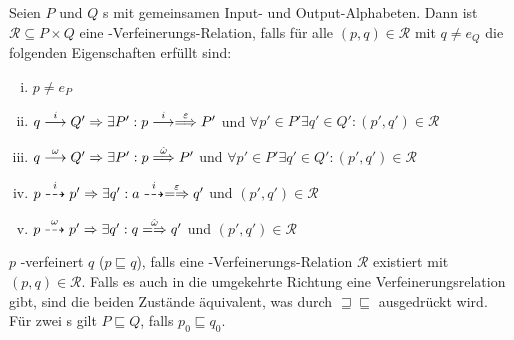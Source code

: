 \begin{Def}
  Seien $P$ und $Q$ \MIA{}s mit gemeinsamen Input- und Output-Alphabeten. Dann
  ist $\mathcal{R}\subseteq P\times Q$ eine \MIA{}-Verfeinerungs-Relation,
  falls für alle $(p,q)\in\mathcal{R}$ mit $q\neq e_Q$ die folgenden
  Eigenschaften erfüllt sind:
  \begin{enumerate}[(i)]
    \item $p\neq e_P$
    \item $q\must[i]Q'\Rightarrow\exists P': p\must[i]\weakmust[\varepsilon]
      P'$ und $\forall p'\in P'\exists q'\in Q':(p',q')\in\mathcal{R}$
    \item $q\must[\omega]Q'\Rightarrow\exists P': p\weakmust[\hat{\omega}]
      P'$ und $\forall p'\in P'\exists q'\in Q':(p',q')\in\mathcal{R}$
    \item $p\may[i]p'\Rightarrow\exists q': a\may[i]\weakmay[\varepsilon]
      q'$ und $(p',q')\in\mathcal{R}$
    \item $p\may[\omega]p'\Rightarrow\exists q': q\weakmay[\hat{\omega}]
      q'$ und $(p',q')\in\mathcal{R}$
  \end{enumerate}
  $p$ \MIA{}-verfeinert $q$ ($p\sqsubseteq q$), falls eine
  \MIA{}-Verfeinerungs-Relation $\mathcal{R}$ existiert mit
  $(p,q)\in\mathcal{R}$. Falls es auch in die umgekehrte Richtung eine
  Verfeinerungsrelation gibt, sind die beiden Zustände äquivalent, was durch
  $\sqsupseteq\sqsubseteq$ ausgedrückt wird. Für zwei \MIA{}s gilt $P\sqsubseteq Q$, falls
  $p_0\sqsubseteq q_0$.
\end{Def}
